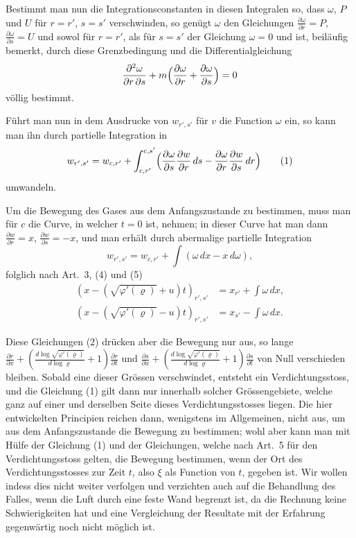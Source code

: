\documentclass[12pt,a4paper]{book}
\theoremstyle{definition}
\theoremstyle{remark}
\begin{document}
Bestimmt man nun die Integrationsconstanten in diesen Integralen so, dass $\omega$, $P$ und $U$ f\"ur $r = r'$, $s = s'$ verschwinden, so gen\"ugt $\omega$ den Gleichungen $\frac{\partial\omega}{\partial r} = P$, $\frac{\partial\omega}{\partial s} = U$ und sowol f\"ur $r = r'$, als f\"ur $s = s'$ der Gleichung $\omega = 0$ und ist, beil\"aufig bemerkt, durch diese Grenzbedingung und die Differentialgleichung
\[
\frac{\partial^{2}\omega}{\partial r\,\partial s} + m\Bigl(\frac{\partial\omega}{\partial r} + \frac{\partial\omega}{\partial s}\Bigr) = 0
\]
v\"ollig bestimmt.

F\"uhrt man nun in dem Ausdrucke von $w_{r',s'}$ f\"ur $v$ die Function $\omega$ ein, so kann man ihn durch partielle Integration in
\begin{equation*}
w_{r',s'} = w_{c,r'} + \int_{c,r'}^{c,s'}\Bigl(\frac{\partial\omega}{\partial s}\frac{\partial w}{\partial r}\,ds - \frac{\partial\omega}{\partial r}\frac{\partial w}{\partial s}\,dr\Bigr)\tag{1}
\end{equation*}
umwandeln.

Um die Bewegung des Gases aus dem Anfangszustande zu bestimmen, muss man f\"ur $c$ die Curve, in welcher $t = 0$ ist, nehmen; in dieser Curve hat man dann $\frac{\partial w}{\partial r} = x$, $\frac{\partial w}{\partial s} = -x$, und man erh\"alt durch abermalige partielle Integration
\[
w_{r',s'} = w_{c,r'} + \int(\omega\,dx - x\,d\omega),
\]
folglich nach Art.~3, (4) und (5)
\begin{align*}
(x - (\sqrt{\varphi'(\varrho)} + u)t)_{r',s'} &= x_{r'} + \int\omega\,dx,\\
(x - (\sqrt{\varphi'(\varrho)} - u)t)_{r',s'} &= x_{s'} - \int\omega\,dx.\tag{2}
\end{align*}

Diese Gleichungen (2) dr\"ucken aber die Bewegung nur aus, so lange $\frac{\partial r}{\partial x} + (\frac{d\log\sqrt{\varphi'(\varrho)}}{d\log\varrho} + 1)\frac{\partial r}{\partial t}$ und $\frac{\partial s}{\partial x} + (\frac{d\log\sqrt{\varphi'(\varrho)}}{d\log\varrho} + 1)\frac{\partial s}{\partial t}$ von Null verschieden bleiben. Sobald eine dieser Gr\"ossen verschwindet, entsteht ein Verdichtungsstoss, und die Gleichung (1) gilt dann nur innerhalb solcher Gr\"ossengebiete, welche ganz auf einer und derselben Seite dieses Verdichtungsstosses liegen. Die hier entwickelten Principien reichen dann, wenigstens im Allgemeinen, nicht aus, um aus dem Anfangszustande die Bewegung zu bestimmen; wohl aber kann man mit H\"ulfe der Gleichung (1) und der Gleichungen, welche nach Art.~5 f\"ur den Verdichtungsstoss gelten, die Bewegung bestimmen, wenn der Ort des Verdichtungsstosses zur Zeit $t$, also $\xi$ als Function von $t$, gegeben ist. Wir wollen indess dies nicht weiter verfolgen und verzichten auch auf die Behandlung des Falles, wenn die Luft durch eine feste Wand begrenzt ist, da die Rechnung keine Schwierigkeiten hat und eine Vergleichung der Resultate mit der Erfahrung gegenw\"artig noch nicht m\"oglich ist.
\end{document}
